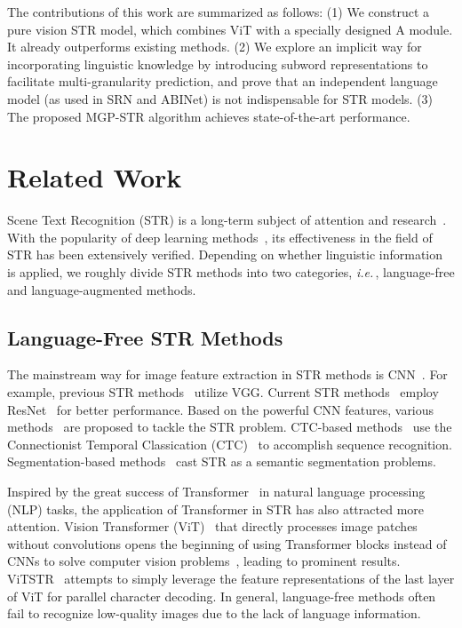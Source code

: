 \documentclass[runningheads]{llncs}
\def\ie{\emph{i.e.}\,}
\begin{document}
The contributions of this work are summarized as follows: (1) We construct a pure vision STR model, which combines ViT with a specially designed A module. It already outperforms existing methods. (2) We explore an implicit way for incorporating linguistic knowledge by introducing subword representations to facilitate multi-granularity prediction, and prove that an independent language model (as used in SRN and ABINet) is not indispensable for STR models. (3) The proposed MGP-STR algorithm achieves state-of-the-art performance.













\section{Related Work}
Scene Text Recognition (STR) is a long-term subject of attention and research~\cite{zhu2016scene,long2021scene,chen2021text}. With the popularity of deep learning methods~\cite{vgg,resnet,rnn1}, its effectiveness in the field of STR has been extensively verified. Depending on whether linguistic information is applied, we roughly divide STR methods into two categories, \ie, language-free and language-augmented methods.

\subsection{Language-Free STR Methods}

The mainstream way for image feature extraction in STR methods is CNN~\cite{vgg,resnet}.
For example, previous STR methods~\cite{CRNN,rare,rnn1} utilize VGG.
Current STR methods~\cite{Rosetta,STAR-Net,deep,GCRNN} employ ResNet~\cite{resnet} for better performance.
Based on the powerful CNN features, various methods~\cite{zhang2022context,PIMNet,liu2022perceiving} are proposed to tackle the STR problem.
CTC-based methods~\cite{CRNN,wan20192d,STAR-Net,gtc,ctc2} use the Connectionist Temporal Classication (CTC)~\cite{ctc} to accomplish sequence recognition.
Segmentation-based methods~\cite{seg,Vocabulary,TextSpotter,TextScanner} cast STR as a semantic segmentation problems. 

Inspired by the great success of Transformer~\cite{trans} in natural language processing (NLP) tasks, the application of Transformer in STR has also attracted more attention. Vision Transformer (ViT)~\cite{dosovitskiy2020image} that directly processes image patches without convolutions opens the beginning of using Transformer blocks instead of CNNs to solve computer vision problems~\cite{liu2021swin,SegFormer}, leading to prominent results. ViTSTR~\cite{ViTSTR} attempts to simply leverage the feature representations of the last layer of  ViT for parallel character decoding. In general, language-free methods often fail to recognize low-quality images due to the lack of language information.
\end{document}
